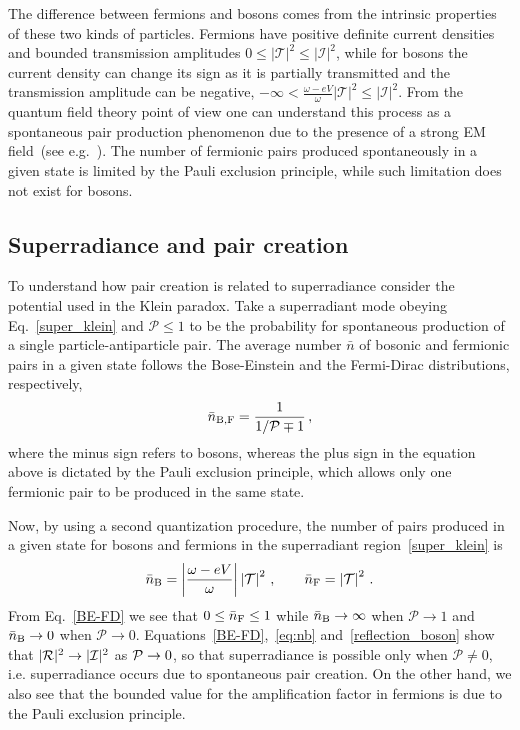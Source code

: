 \documentclass[11pt]{article}
\newcommand{\be}{\begin{equation}}
\newcommand{\ee}{\end{equation}}
\numberwithin{equation}{section} %
\begin{document}
The difference between fermions and bosons comes from the intrinsic properties of these two kinds of particles. Fermions 
have positive definite current densities and bounded transmission amplitudes $0\leq \left|\mathcal{T}\right|^2\leq 
|\mathcal{I}|^2$, while for bosons the current density can change its sign as it is partially transmitted and the 
transmission amplitude can be negative, $-\infty < \frac{\omega-eV}{\omega}\left|\mathcal{T}\right|^2\leq 
|\mathcal{I}|^2$. From the quantum field theory point of view one can understand this process as a spontaneous pair 
production phenomenon due to the presence of a strong EM field~(see e.g.~\cite{Manogue1988}). The number of fermionic 
pairs produced spontaneously in a given state is limited by the Pauli exclusion principle, while such limitation does 
not exist for bosons.  
\subsection{Superradiance and pair creation}
To understand how pair creation is related to superradiance consider the potential used in the Klein paradox. Take a superradiant mode obeying Eq.~\eqref{super_klein} and $\mathcal{P}\leq 1$ to be the probability for spontaneous production of a single particle-antiparticle pair. The average number $\bar{n}$ of bosonic and fermionic pairs in a given state follows the Bose-Einstein and the Fermi-Dirac distributions, respectively,~\cite{Hansen:1980nc}
%
\be
\bar{n}_{{\rm B},{\rm F}}=\frac{1}{{1}/{\mathcal{P}}\mp 1}\,, \label{BE-FD}
\ee
%
where the minus sign refers to bosons, whereas the plus sign in the equation above is dictated by the Pauli exclusion principle, which allows only one fermionic pair to be produced in the same state.


Now, by using a second quantization procedure, the number of pairs produced in a given state for bosons and fermions in the superradiant region~\eqref{super_klein} is~\cite{Manogue1988}
%
\be
\bar{n}_{\rm B}=\left|\frac{\omega-eV}{\omega}\right|\left|\mathcal{T}\right|^2\,,\qquad 
\bar{n}_{\rm F}=\left|\mathcal{T}\right|^2\,. \label{eq:nb}
\ee
%
From Eq.~\eqref{BE-FD} we see that $0\leq\bar{n}_{\rm F}\leq 1$ while $\bar{n}_{\rm B}\to \infty$ when $\mathcal{P}\to 1$ and $\bar{n}_{\rm B}\to 0$ when $\mathcal{P}\to 0$. Equations~\eqref{BE-FD},~\eqref{eq:nb} and~\eqref{reflection_boson} show that $|{\cal R}|^2\to |\mathcal{I}|^2$ as ${\cal P}\to0$, so that superradiance is possible only when $\mathcal{P}\neq 0$, i.e. superradiance occurs due to spontaneous pair creation. On the other hand, we also see that the bounded value for the amplification factor in fermions is due to the Pauli exclusion principle. 
\end{document}
